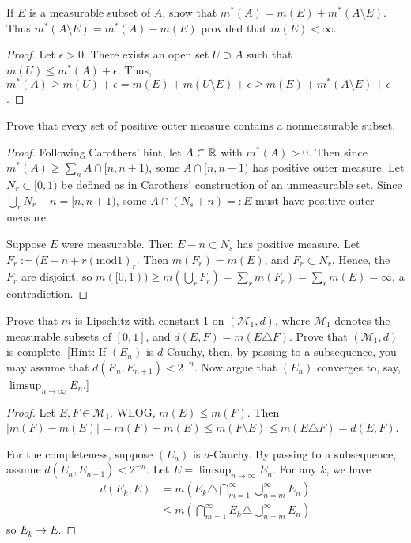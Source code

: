 \documentclass{article}
\begin{document}
 If $E$ is a measurable subset of $A$, show that $m^*(A) = m(E) + m^*(A \setminus E)$. Thus $m^*(A \setminus E) = m^*(A) - m(E)$ provided that $m(E) < \infty$.
\begin{proof}
Let $\epsilon > 0$. There exists an open set $U \supset A$ such that $m(U) \le m^*(A) + \epsilon$. Thus, $m^*(A) \ge m(U) + \epsilon = m(E) + m(U\setminus E) + \epsilon \ge m(E) + m^*(A\setminus E) + \epsilon$.
\end{proof}
 Prove that every set of positive outer measure contains a nonmeasurable subset.
\begin{proof}
Following Carothers' hint, let $A \subset \mathbb{R}$ with $m^*(A) > 0$. Then since $m^*(A) \ge \sum_n A \cap [n, n+1)$, some $A \cap [n, n+1)$ has positive outer measure. Let $N_r \subset [0,1)$ be defined as in Carothers' construction of an unmeasurable set. Since $\bigcup_r N_r + n = [n, n+1)$, some $A \cap (N_s +n) =: E$ must have positive outer measure. 

Suppose $E$ were measurable. Then $E - n \subset N_s$ has positive measure. Let $F_r := (E - n + r (\mathrm{mod } 1)_r$. Then $m(F_r) = m(E)$, and $F_r \subset N_r$. Hence, the $F_r$ are disjoint, so $m([0,1))  \geq m(\bigcup_r F_r) = \sum_r m(F_r) = \sum_r m(E) = \infty$, a contradiction.
\end{proof}
 Prove that $m$ is Lipschitz with constant 1 on $(\mathcal{M}_1, d)$, where $\mathcal{M}_1$ denotes the measurable subsets of $[0,1]$, and $d(E,F) = m(E\triangle F)$. Prove that $(\mathcal M_1, d)$ is complete. [Hint: If $(E_n)$ is $d$-Cauchy, then, by passing to a subsequence, you may assume that $d(E_n, E_{n+1}) < 2^{-n}$. Now argue that $(E_n)$ converges to, say, $\limsup_{n \rightarrow \infty}E_n$.]
\begin{proof}
Let $E,F \in \mathcal M_1$. WLOG, $m(E) \le m(F)$. Then $|m(F) - m(E)| = m(F) - m(E) \le m(F\setminus E) \le m(E \triangle F) = d(E,F)$.

For the completeness, suppose $(E_n)$ is $d$-Cauchy. By passing to a subsequence, assume $d(E_n, E_{n+1}) < 2^{-n}$. Let $E = \limsup_{n\rightarrow \infty} E_n$.  For any $k$, we have 
\begin{align*}
d(E_k, E) & = m(E_k \triangle \bigcap_{m=1}^\infty\bigcup_{n=m}^\infty E_n)
\\ &\le m(\bigcap_{m=1}^\infty E_k \triangle \bigcup_{n=m}^\infty E_n)
\end{align*}
so $E_k \rightarrow E$.

\end{proof}
\end{document}
